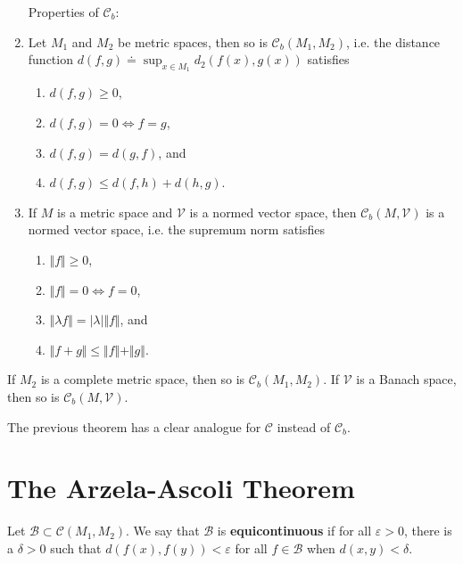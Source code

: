 \documentclass[10pt]{report}
\begin{document}
\begin{thrm}[]
\begin{enumerate}
	Properties of $\mathcal{C}_{b}$:
	\item Let $M_1$ and $M_2$ be metric spaces, then so is $\mathcal{C}_b(M_1,M_2)$, i.e. the distance function $d(f,g) \doteq \sup_{x\in M_1} d_2(f(x), g(x))$ satisfies
		\begin{enumerate}
			\item $d(f,g) \geq 0$,
			\item $d(f,g) = 0 \iff f=g$,
			\item $d(f,g) = d(g,f)$, and
			\item $d(f,g) \leq d(f,h) + d(h,g)$.
		\end{enumerate}

	\item If $M$ is a metric space and $\mathcal{V}$ is a normed vector space, then $\mathcal{C}_b(M,\mathcal{V})$ is a normed vector space, i.e. the supremum norm satisfies
		\begin{enumerate}
			\item $\Vert{f}\Vert\geq 0$,
			\item $\Vert{f}\Vert=0 \iff f=0$,
			\item $\Vert{\lambda f}\Vert = |\lambda| \Vert{f}\Vert$, and
			\item $\Vert{f+g}\Vert\leq \Vert{f}\Vert+\Vert{g}\Vert$.
		\end{enumerate}
\end{enumerate}
\end{thrm}

\begin{thrm}[]
	If $M_2$ is a complete metric space, then so is $\mathcal{C}_b(M_1,M_2)$. If $\mathcal{V}$ is a Banach space, then so is $\mathcal{C}_b(M, \mathcal{V})$.
\end{thrm}

\begin{note}{}{}
The previous theorem has a clear analogue for $\mathcal{C}$ instead of $\mathcal{C}_b$.
\end{note}


\section{The Arzela-Ascoli Theorem}

\begin{defn}[]
	Let $\mathcal{B} \subset \mathcal{C}(M_1, M_2)$. We say that $\mathcal{B}$ is \textbf{equicontinuous} if for all $\varepsilon>0$, there is a $\delta>0$ such that $d(f(x), f(y)) < \varepsilon$ for all $f \in \mathcal{B}$ when $d(x,y) < \delta$.
\end{defn}
\end{document}
